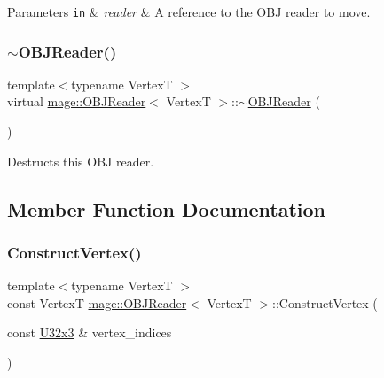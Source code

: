 \begin{DoxyParams}[1]{Parameters}
\mbox{\tt in}  & {\em reader} & A reference to the O\+BJ reader to move. \\
\hline
\end{DoxyParams}
\hypertarget{classmage_1_1_o_b_j_reader_ad1ff7472ec560a29fe58b594d84dc43e}{}\label{classmage_1_1_o_b_j_reader_ad1ff7472ec560a29fe58b594d84dc43e} 
\subsubsection{\texorpdfstring{$\sim$\+O\+B\+J\+Reader()}{~OBJReader()}}
{\footnotesize\ttfamily template$<$typename VertexT $>$ \\
virtual \hyperlink{classmage_1_1_o_b_j_reader}{mage\+::\+O\+B\+J\+Reader}$<$ VertexT $>$\+::$\sim$\hyperlink{classmage_1_1_o_b_j_reader}{O\+B\+J\+Reader} (\begin{DoxyParamCaption}{ }\end{DoxyParamCaption})\hspace{0.3cm}{\ttfamily [virtual]}}

Destructs this O\+BJ reader. 

\subsection{Member Function Documentation}
\hypertarget{classmage_1_1_o_b_j_reader_af81b8f698b015c55a2f32c9f6fe5419d}{}\label{classmage_1_1_o_b_j_reader_af81b8f698b015c55a2f32c9f6fe5419d} 
\subsubsection{\texorpdfstring{Construct\+Vertex()}{ConstructVertex()}}
{\footnotesize\ttfamily template$<$typename VertexT $>$ \\
const VertexT \hyperlink{classmage_1_1_o_b_j_reader}{mage\+::\+O\+B\+J\+Reader}$<$ VertexT $>$\+::Construct\+Vertex (\begin{DoxyParamCaption}\item[{const \hyperlink{namespacemage_ab3633c193f686845fcf80ce95d18a20b}{U32x3} \&}]{vertex\+\_\+indices }\end{DoxyParamCaption})\hspace{0.3cm}{\ttfamily [private]}}

